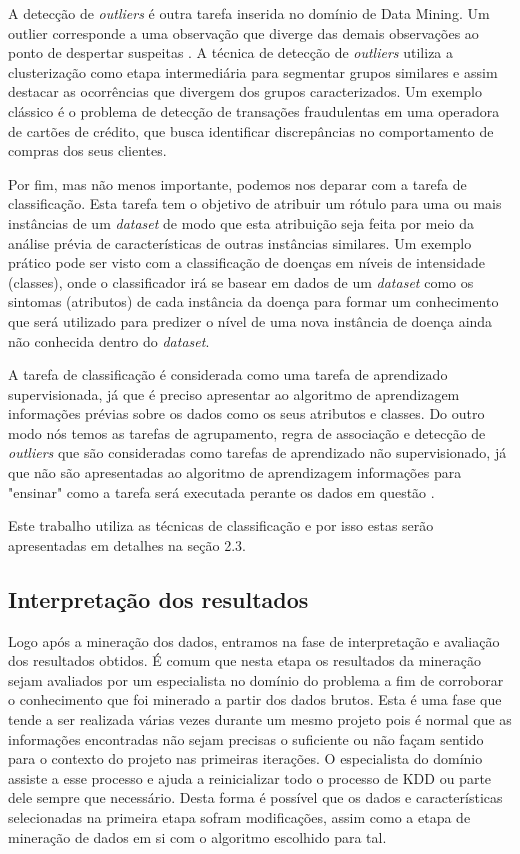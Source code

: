 A detecção de \emph{outliers} é outra tarefa inserida no domínio de Data Mining. Um outlier corresponde a uma observação que diverge das demais observações ao ponto de despertar suspeitas \cite{Chandola2009}. A técnica de detecção de \emph{outliers} utiliza a clusterização como etapa intermediária para segmentar grupos similares e assim destacar as ocorrências que divergem dos grupos caracterizados. Um exemplo clássico é o problema de detecção de transações fraudulentas em uma operadora de cartões de crédito, que busca identificar discrepâncias no comportamento de compras dos seus clientes.

Por fim, mas não menos importante, podemos nos deparar com a tarefa de classificação. Esta tarefa tem o objetivo de atribuir um rótulo para uma ou mais instâncias de um \emph{dataset} de modo que esta atribuição seja feita por meio da análise prévia de características de outras instâncias similares. Um exemplo prático pode ser visto com a classificação de doenças em níveis de intensidade (classes), onde o classificador irá se basear em dados de um \emph{dataset} como os sintomas (atributos) de cada instância da doença para formar um conhecimento que será utilizado para predizer o nível de uma nova instância de doença ainda não conhecida dentro do \emph{dataset}.

A tarefa de classificação é considerada como uma tarefa de aprendizado supervisionada, já que é preciso apresentar ao algoritmo de aprendizagem informações prévias sobre os dados como os seus atributos e classes. Do outro modo nós temos as tarefas de agrupamento, regra de associação e detecção de \emph{outliers} que são consideradas como tarefas de aprendizado não supervisionado, já que não são apresentadas ao algoritmo de aprendizagem informações para "ensinar" como a tarefa será executada perante os dados em questão \cite{Aggarwal2015}.

Este trabalho utiliza as técnicas de classificação e por isso estas serão apresentadas em detalhes na seção 2.3.


\subsection{Interpretação dos resultados}

Logo após a mineração dos dados, entramos na fase de interpretação e avaliação dos resultados obtidos.  É comum que nesta etapa os resultados da mineração sejam avaliados por um especialista no domínio do problema a fim de corroborar o conhecimento que foi minerado a partir dos dados brutos. Esta é uma fase que tende a ser realizada várias vezes durante um mesmo projeto pois é normal que as informações encontradas não sejam precisas o suficiente ou não façam sentido para o contexto do projeto nas primeiras iterações. O especialista do domínio assiste a esse processo e ajuda a reinicializar todo o processo de KDD ou parte dele sempre que necessário. Desta forma é possível que os dados e características selecionadas na primeira etapa sofram modificações, assim como a etapa de mineração de dados em si com o algoritmo escolhido para tal.

